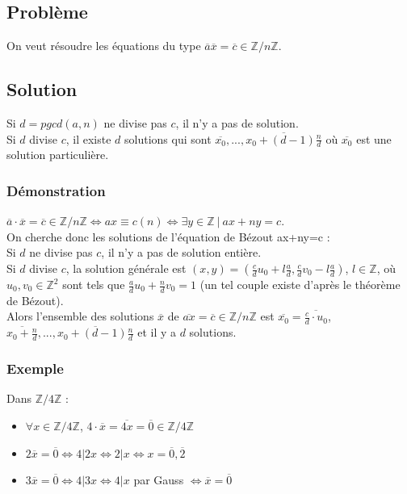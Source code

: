 \documentclass[a4paper,10pt]{book} %
\newcommand{\Z}{\mathbb{Z}}
\newcommand{\tq}{~|~}
\begin{document}
\subsection{Problème}
On veut résoudre les équations du type  $\overline{a}\overline{x}=\overline{c}\in\Z/n\Z$.

\subsection{Solution}
Si $d=pgcd(a,n)$ ne divise pas $c$, il n'y a pas de solution.\\

Si $d$ divise $c$, il existe $d$ solutions qui sont  $\overline{x_0},...,\overline{x_0+(d-1)\frac{n}{d}}$ où $\overline{x_0}$ est une solution particulière.

\subsubsection{Démonstration}
$\overline{a}\cdot \overline{x}=\overline{c}\in \Z/n\Z \Leftrightarrow ax\equiv c(n) \Leftrightarrow \exists y\in \Z \tq ax+ny= c$.\\

On cherche donc les solutions de l'équation de Bézout ax+ny=c :\\
Si $d$ ne divise pas $c$, il n'y a pas de solution entière.\\
Si $d$ divise $c$, la solution générale est $(x,y)=
(\frac{c}{d} u_0 +l\frac{a}{d},
\frac{c}{d} v_0 -l\frac{a}{d})$, $l\in\Z$, où $u_0,v_0\in\Z^2$ sont tels que $\frac{a}{d}u_0+\frac{n}{d}v_0=1$ (un tel couple existe d'après le théorème de Bézout).\\

Alors l'ensemble des solutions $\overline{x}$ de $\overline{ax}=\overline{c}\in\Z/n\Z$
est $\overline{x_0}=\overline{\frac{c}{d}\cdot u_0}$, $\overline{x_0+\frac{n}{d}},...,\overline{x_0+(d-1)\frac{n}{d}}$
et il y a $d$ solutions.

\subsubsection{Exemple}
Dans $\Z/4\Z$ :
\begin{itemize}[label=$\cdot$]
\item $\forall x\in \Z/4\Z$, $4\cdot\overline{x}=\overline{4x}=\overline{0}\in\Z/4\Z$

\item $2\overline{x}=\overline{0} \Leftrightarrow4|2x\Leftrightarrow2|x \Leftrightarrow x=\overline{0},\overline{2}$

\item $3\overline{x}=\overline{0}\Leftrightarrow 4|3x \Leftrightarrow 4|x$ par Gauss $\Leftrightarrow \overline{x}=\overline{0}$
\end{itemize}
\end{document}

